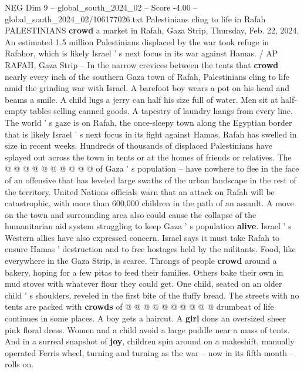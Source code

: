\begin{textsample}{NEG Dim 9 – global\_south\_2024\_02 – Score -4.00 – global\_south\_2024\_02/106177026.txt}  \label{ex:f9_neg_348}
Palestinians cling to life in Rafah PALESTINIANS \textbf{crowd} a market in Rafah, Gaza Strip, Thursday, Feb. 22, 2024.
An estimated 1.5 million Palestinians displaced by the war took refuge in Rafahor, which is likely Israel ' s next focus in its war against Hamas. / AP RAFAH, Gaza Strip -- In the narrow crevices between the tents that \textbf{crowd} nearly every inch of the southern Gaza town of Rafah, Palestinians cling to life amid the grinding war with Israel.
A barefoot boy wears a pot on his head and beams a smile.
A child lugs a jerry can half his size full of water.
Men sit at half-empty tables selling canned goods.
A tapestry of laundry hangs from every line.
The world ' s gaze is on Rafah, the once-sleepy town along the Egyptian border that is likely Israel ' s next focus in its fight against Hamas.
Rafah has swelled in size in recent weeks.
Hundreds of thousands of displaced Palestinians have splayed out across the town in tents or at the homes of friends or relatives.
The @ @ @ @ @ @ @ @ @ @ of Gaza ' s population -- have nowhere to flee in the face of an offensive that has leveled large swaths of the urban landscape in the rest of the territory.
United Nations officials warn that an attack on Rafah will be catastrophic, with more than 600,000 children in the path of an assault.
A move on the town and surrounding area also could cause the collapse of the humanitarian aid system struggling to keep Gaza ' s population \textbf{alive}.
Israel ' s Western allies have also expressed concern.
Israel says it must take Rafah to ensure Hamas ' destruction and to free hostages held by the militants.
Food, like everywhere in the Gaza Strip, is scarce.
Throngs of people \textbf{crowd} around a bakery, hoping for a few pitas to feed their families.
Others bake their own in mud stoves with whatever flour they could get.
One child, seated on an older child ' s shoulders, reveled in the first bite of the fluffy bread.
The streets with no tents are packed with \textbf{crowds} of @ @ @ @ @ @ @ @ @ @ drumbeat of life continues in some places.
A boy gets a haircut.
A \textbf{girl} dons an oversized sheer pink floral dress.
Women and a child avoid a large puddle near a mass of tents.
And in a surreal snapshot of \textbf{joy}, children spin around on a makeshift, manually operated Ferris wheel, turning and turning as the war -- now in its fifth month -- rolls on.

\end{textsample}
